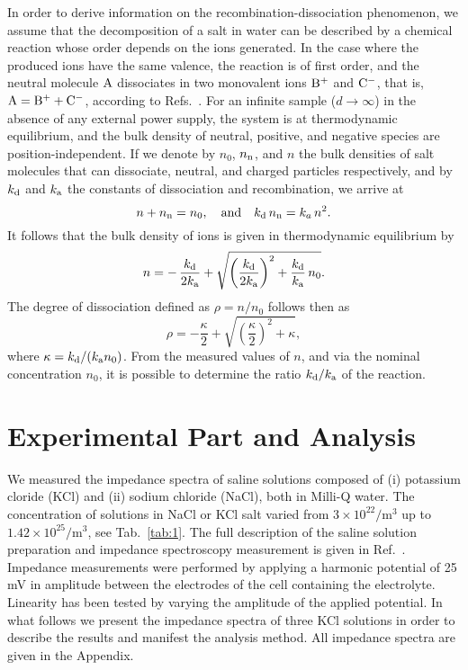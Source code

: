 \documentclass[preprint,aps,pre]{revtex4}
\begin{document}
In order to derive information on the recombination-dissociation phenomenon, we assume that the decomposition of a salt in water can be described by a chemical reaction whose order depends on the ions generated. In the case where the produced ions have the same valence, the reaction is of first order, and the neutral molecule $\rm A$ dissociates in two monovalent ions $\rm B^+$ and $\rm C^-$, that is, $\rm A = \rm B^{+}+\rm C^{-}$, according to Refs.~\cite{derfel,ioannis,wang,JML}. For an infinite sample ($d\to \infty$) in the absence of any external power supply, the system is at thermodynamic equilibrium, and the bulk density of neutral, positive, and negative species are position-independent. If we denote by $n_0$, $n_{\rm n}$, and $n$ the bulk densities of salt molecules that can dissociate, neutral, and charged particles respectively, and by $k_{\rm d}$ and $k_{\rm a}$ the constants of dissociation and recombination, we arrive at
\begin{equation}
\label{eq:11} n+n_{\rm n}=n_0,\quad{\rm and}\quad  k_{\rm d}\,n_{\rm n}=k_a\,n^2.
\end{equation}
It follows that the bulk density of ions is given in thermodynamic equilibrium by
\begin{equation}
\label{eq:12} n=-\,\frac{k_{\rm d}}{2 k_{\rm a}}+\sqrt{\left(\frac{k_{\rm d}}{2 k_{\rm a}}\right)^2+\frac{k_{\rm d}}{k_{\rm a}}\,n_0}.
\end{equation}
The degree of dissociation defined as $\rho=n/n_0$ follows then as
\begin{equation}
\label{eq:13} \rho=-\frac{\kappa}{2}+\sqrt{\left(\frac{\kappa}{2}\right)^2+\kappa},
\end{equation}
where $\kappa=k_{\rm d}/(k_{\rm a} n_0)$. From the measured values of $n$, and via the nominal concentration  $n_0$, it is possible to determine the ratio $k_{\rm d}/k_{\rm  a}$ of the reaction.

\section{Experimental Part and Analysis}
\label{sec:3}

We measured the impedance spectra of saline solutions composed of (i) potassium cloride (KCl) and (ii) sodium chloride (NaCl), both in Milli-Q water. The concentration of solutions in NaCl or KCl salt varied from $3\times 10^{22}/\mathrm{m^3}$ up to $1.42\times 10^{25}/\mathrm{m^3}$, see Tab.~\ref{tab:1}. The full description of the saline solution preparation and impedance spectroscopy measurement is given in Ref.~\cite{JML}. Impedance measurements were performed by applying a harmonic potential of 25 mV in amplitude between the electrodes of the cell containing the electrolyte. Linearity has been tested by varying the amplitude of the applied potential. In what follows we present the impedance spectra of three KCl solutions in order to describe the results and manifest the analysis method. All impedance spectra are given in the Appendix.
\end{document}
